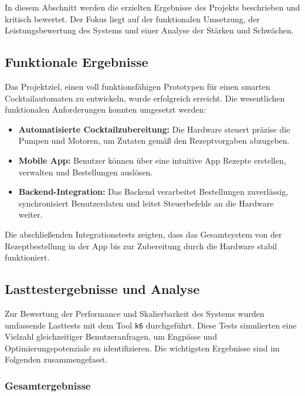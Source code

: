 In diesem Abschnitt werden die erzielten Ergebnisse des Projekts beschrieben und kritisch bewertet. 
Der Fokus liegt auf der funktionalen Umsetzung, der Leistungsbewertung des Systems und einer Analyse 
der Stärken und Schwächen.

\subsection{Funktionale Ergebnisse}

Das Projektziel, einen voll funktionsfähigen Prototypen für einen smarten Cocktailautomaten zu 
entwickeln, wurde erfolgreich erreicht. Die wesentlichen funktionalen Anforderungen konnten 
umgesetzt werden:

\begin{itemize}
  \item \textbf{Automatisierte Cocktailzubereitung:} Die Hardware steuert präzise die \\Pumpen und 
  Motoren, um Zutaten gemäß den Rezeptvorgaben abzugeben.
  \item \textbf{Mobile App:} Benutzer können über eine intuitive App Rezepte erstellen, verwalten 
  und Bestellungen auslösen.
  \item \textbf{Backend-Integration:} Das Backend verarbeitet Bestellungen zuverlässig, 
  \\synchronisiert Benutzerdaten und leitet Steuerbefehle an die Hardware \\weiter.
\end{itemize}
Die abschließenden Integrationstests zeigten, dass das Gesamtsystem von der Rezeptbestellung in der 
App bis zur Zubereitung durch die Hardware stabil \\funktioniert.

\subsection{Lasttestergebnisse und Analyse}

Zur Bewertung der Performance und Skalierbarkeit des Systems wurden umfassende Lasttests mit dem 
Tool \texttt{k6} durchgeführt. Diese Tests simulierten eine Vielzahl gleichzeitiger 
Benutzeranfragen, um Engpässe und Optimierungspotenziale zu identifizieren. Die wichtigsten 
Ergebnisse sind im Folgenden zusammengefasst.

\subsubsection*{Gesamtergebnisse}

